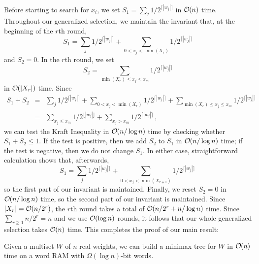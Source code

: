 \documentclass[runningheads]{llncs}
\newcommand{\Oh}[1]
    {\ensuremath{\mathcal{O} \hspace{-.5ex} \left( {#1} \right)}}
\begin{document}
Before starting to search for $x_i$, we set \(S_1 = \sum_j 1 / 2^{\lceil |w_j| \rceil}\) in $\Oh{n}$ time.  Throughout our generalized selection, we maintain the invariant that, at the beginning of the $r$th round,
\[S_1 = \sum_j 1 / 2^{\lceil |w_j| \rceil} +
    \sum_{0 < x_j < \min (X_r)} 1 / 2^{\lceil |w_j| \rceil}\]
and \(S_2 = 0\).  In the $r$th round, we set
\[S_2 = \sum_{\min (X_r) \leq x_j \leq x_m} 1 / 2^{\lceil |w_j| \rceil}\]
in $\Oh{|X_r|}$ time.  Since
\begin{eqnarray*}
S_1 + S_2
& = & \sum_j 1 / 2^{\lceil |w_j| \rceil} +
    \sum_{0 < x_j < \min (X_r)} 1 / 2^{\lceil |w_j| \rceil} +
    \sum_{\min (X_r) \leq x_j \leq x_m} 1 / 2^{\lceil |w_j| \rceil}\\
& = & \sum_{x_j \leq x_m} 1 / 2^{\lfloor |w_j| \rfloor} +
    \sum_{x_j > x_m} 1 / 2^{\lceil |w_j| \rceil}\,,
\end{eqnarray*}
we can test the Kraft Inequality in $\Oh{n / \log n}$ time by checking whether \(S_1 + S_2 \leq 1\).  If the test is positive, then we add $S_2$ to $S_1$ in $\Oh{n / \log n}$ time; if the test is negative, then we do not change $S_1$.  In either case, straightforward calculation shows that, afterwards,
\[S_1 = \sum_j 1 / 2^{\lceil |w_j| \rceil} +
    \sum_{0 < x_j < \min (X_{r +1})} 1 / 2^{\lceil |w_j| \rceil}\,\]
so the first part of our invariant is maintained.  Finally, we reset \(S_2 = 0\) in $\Oh{n / \log n}$ time, so the second part of our invariant is maintained.  Since \(|X_r| = \Oh{n / 2^r}\), the $r$th round takes a total of $\Oh{n / 2^r + n / \log n}$ time.  Since \(\sum_{r \geq 1} n / 2^r = n\) and we use $\Oh{\log n}$ rounds, it follows that our whole generalized selection takes $\Oh{n}$ time.  This completes the proof of our main result:

\begin{theorem} \label{thm:reals}
Given a multiset $W$ of $n$ real weights, we can build a minimax tree for $W$ in $\Oh{n}$ time on a word RAM with \(\Omega (\log n)\)-bit words.
\end{theorem}



\end{document}
